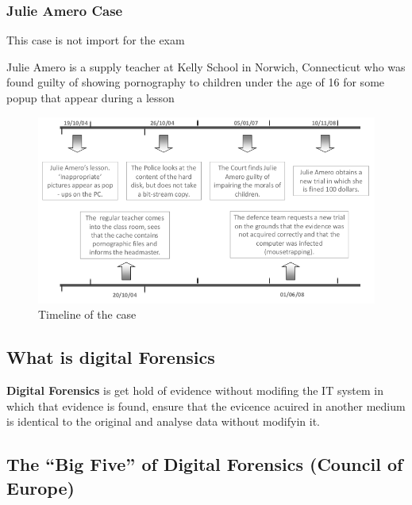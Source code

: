 \newpage
\subsubsection{Julie Amero Case}

\begin{boxH}
  This case is not import for the exam
\end{boxH}

Julie Amero is a supply teacher at Kelly School in Norwich, Connecticut
who was found guilty of showing pornography to children under the age of 16
for some popup that appear during a lesson

\begin{figure}[h!]
  \centering
  \includegraphics[width=1\textwidth]{img/amero_case.png}
  \caption{Timeline of the case}
  \label{fig:amero case}
\end{figure}

\subsection{What is digital Forensics}

\textbf{Digital Forensics} is get hold of evidence without modifing the IT
system in which that evidence is found, ensure that the
evicence acuired in another medium is identical to the original and
analyse data without modifyin it.

\subsection{The “Big Five” of Digital Forensics (Council of Europe)}

